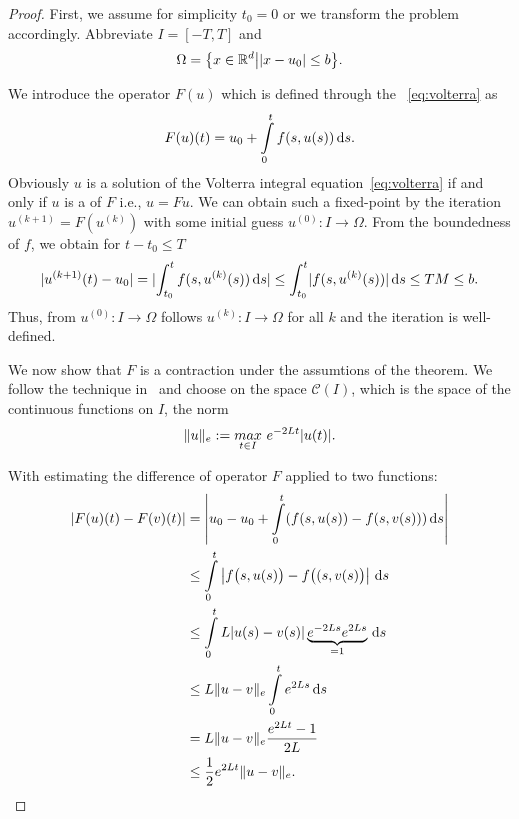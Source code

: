 

\begin{proof}
  First, we assume for simplicity $t_0=0$ or we transform the problem
  accordingly. Abbreviate $I = [-T,T]$ and
  \begin{gather*}
    \Omega = \bigl\{x\in \mathbb R^d\big| \lvert x-u_0\rvert \le b \bigr\}.
  \end{gather*}

  We introduce the operator $F(u)$ which is defined
  through the ~\eqref{eq:volterra} as
  \begin{gather}
    \label{eq:awa:16}
   F(u)(t) = u_0 + \int\limits_{0}^t f(s,u(s)) \,\mathrm{d} s.
  \end{gather}
  Obviously $u$ is a solution of the Volterra integral
  equation~\eqref{eq:volterra} if and only if $u$ is a  of $F$ i.e., $u=Fu$. We can obtain such a fixed-point by
  the iteration $u^{(k+1)} = F(u^{(k)})$ with some initial guess
  $u^{(0)}:I\to\Omega$. From the boundedness of $f$, we obtain for
  $t-t_0 \le T$
  \begin{align*}
    \lvert u^{(k+1)}(t)-u_0\rvert = \lvert\int_{t_0}^t f(s,u^{(k)}(s))\,\mathrm{d} s\rvert \le \int_{t_0}^t
    \lvert f(s,u^{(k)}(s))\rvert\,\mathrm{d} s \le TM \le b.
  \end{align*}
  Thus, from $u^{(0)}:I\to\Omega$ follows $u^{(k)}:I\to\Omega$ for all
  $k$ and the iteration is well-defined.
  
  We now show that $F$ is a contraction under the assumtions of the
  theorem. We follow the technique
  in~\cite[\S117]{Heuser86} and choose on the space $\mathcal C(I)$,
  which is the space of the continuous functions on $I$, the norm
  \begin{gather*}
    \lVert u\rVert_e := \underset{t \in I}{max} ~e^{-2 L t} |u(t)|.
  \end{gather*}
  
  With estimating the difference of operator $F$ applied to two functions:
  \begin{align*}
    |F(u)(t) - F(v)(t)|
    & = \left| u_0 - u_0 + \int\limits_{0}^t (f(s,u(s)) - f(s,v(s))) \,\mathrm{d} s \right| \\
    & \le \int\limits_{0}^t \left| f\bigl(s,u(s)\bigr) - f\bigl((s,v(s)\bigr) \right| \,\mathrm{d} s \\
    & \le \int\limits_{0}^t L |u(s) - v(s)| \underbrace{e^{-2 L s} e^{2 L s}}_{= 1} \,\mathrm{d} s \\
    & \le L \lVert u-v\rVert_e \int\limits_{0}^t e^{2 L s} \,\mathrm{d} s \\
    & = L \lVert u-v\rVert_e \frac{e^{2 L t} - 1}{2 L} \\
    & \le \frac12 e^{2 L t} \lVert u-v\rVert_e.
  \end{align*}


\end{proof}
